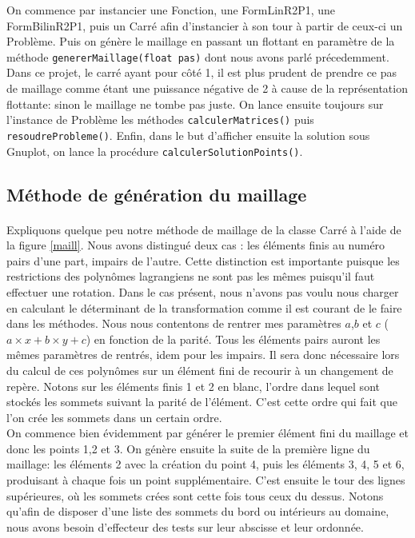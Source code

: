 On commence par instancier une Fonction, une FormLinR2P1, une FormBilinR2P1, puis un Carré afin d'instancier à son tour à partir de ceux-ci un Problème. Puis on génère le maillage en passant un flottant en paramètre de la méthode \texttt{genererMaillage(float pas)} dont nous avons parlé précedemment. Dans ce projet, le carré ayant pour côté 1, il est plus prudent de prendre ce pas de maillage comme étant une puissance négative de 2 à cause de la représentation flottante: sinon le maillage ne tombe pas juste. On lance ensuite toujours sur l'instance de Problème les méthodes \texttt{calculerMatrices()} puis \texttt{resoudreProbleme()}. Enfin, dans le but d'afficher ensuite la solution sous Gnuplot, on lance la procédure \texttt{calculerSolutionPoints()}.\\ 

\subsection{Méthode de génération du maillage}
\paragraph{} Expliquons quelque peu notre méthode de maillage de la classe Carré à l'aide de la figure \ref{maill}. Nous avons distingué deux cas : les éléments finis au numéro pairs d'une part, impairs de l'autre. Cette distinction est importante puisque les restrictions des polynômes lagrangiens ne sont pas les mêmes puisqu'il faut effectuer une rotation. Dans le cas présent, nous n'avons pas voulu nous charger en calculant le déterminant de la transformation comme il est courant de le faire dans les méthodes. Nous nous contentons de rentrer mes paramètres $a$,$b$ et $c$ ($a\times x+b\times y +c$) en fonction de la parité. Tous les éléments pairs auront les mêmes paramètres de rentrés, idem pour les impairs. Il sera donc nécessaire lors du calcul de ces polynômes sur un élément fini de recourir à un changement de repère. Notons sur les éléments finis 1 et 2 en blanc, l'ordre dans lequel sont stockés les sommets suivant la parité de l'élément. C'est cette ordre qui fait que l'on crée les sommets dans un certain ordre.\\

On commence bien évidemment par générer le premier élément fini du maillage et donc les points 1,2 et 3. On génère ensuite la suite de la première ligne du maillage: les éléments 2 avec la création du point 4, puis les éléments 3, 4, 5 et 6, produisant à chaque fois un point supplémentaire. C'est ensuite le tour des lignes supérieures, où les sommets crées sont cette fois tous ceux du dessus. Notons qu'afin de disposer d'une liste des sommets du bord ou intérieurs au domaine, nous avons besoin d'effecteur des tests sur leur abscisse et leur ordonnée.\\

